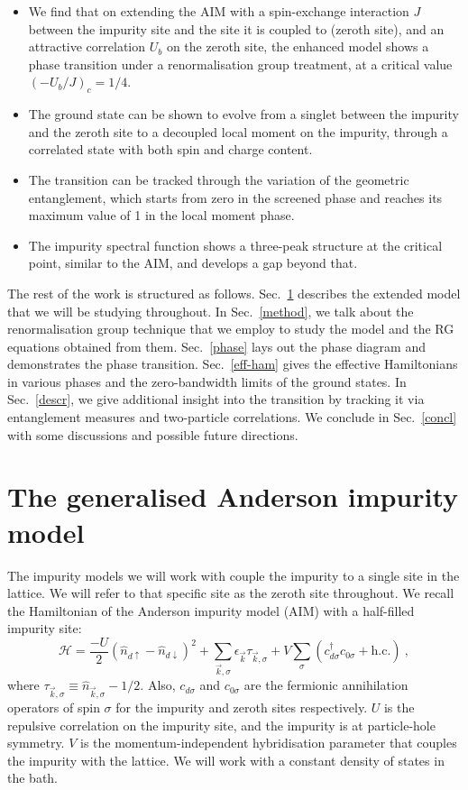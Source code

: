 \documentclass[reprint,superscriptaddress,floatfix]{revtex4-2}
\begin{document}
\begin{itemize}
	\item We find that on extending the AIM with a spin-exchange interaction \(J\) between the impurity site and the site it is coupled to (zeroth site), and an attractive correlation \(U_b\) on the zeroth site, the enhanced model shows a phase transition under a renormalisation group treatment, at a critical value \(\left(-U_b/J\right)_c=1/4\). 
	\item The ground state can be shown to evolve from a singlet between the impurity and the zeroth site to a decoupled local moment on the impurity, through a correlated state with both spin and charge content.
	\item The transition can be tracked through the variation of the geometric entanglement, which starts from zero in the screened phase and reaches its maximum value of 1 in the local moment phase.
	\item The impurity spectral function shows a three-peak structure at the critical point, similar to the AIM, and develops a gap beyond that.
\end{itemize}
 
The rest of the work is structured as follows. Sec.~\ref{def-ham} describes the extended model that we will be studying throughout. In Sec.~\ref{method}, we talk about the renormalisation group technique that we employ to study the model and the RG equations obtained from them. Sec.~\ref{phase} lays out the phase diagram and demonstrates the phase transition. Sec.~\ref{eff-ham} gives the effective Hamiltonians in various phases and the zero-bandwidth limits of the ground states. In Sec.~\ref{descr}, we give additional insight into the transition by tracking it via entanglement measures and two-particle correlations. We conclude in Sec.~\ref{concl} with some discussions and possible future directions.


\section{The generalised Anderson impurity model}
\label{def-ham}

The impurity models we will work with couple the impurity to a single site in the lattice. We will refer to that specific site as the zeroth site throughout. We recall the Hamiltonian of the Anderson impurity model (AIM) with a half-filled impurity site:
\begin{equation} 
	\mathcal{H} = \frac{- U}{2} \left(\hat n_{d \uparrow} - \hat n_{d \downarrow}\right)^2 + \sum_{\vec k,\sigma} \epsilon_{\vec k} \tau_{\vec k,\sigma} + V\sum_\sigma \left( c^\dagger_{d\sigma}c_{0\sigma} + \text{h.c.}\right)~,
 \end{equation}
where \(\tau_{\vec k,\sigma} \equiv \hat n_{\vec k,\sigma} - 1/2\). Also, \(c_{d\sigma}\) and \(c_{0\sigma}\) are the fermionic annihilation operators of spin \(\sigma\) for the impurity and zeroth sites respectively. \(U\) is the repulsive correlation on the impurity site, and the impurity is at particle-hole symmetry. \(V\) is the momentum-independent hybridisation parameter that couples the impurity with the lattice. We will work with a constant density of states in the bath. 
\end{document}
